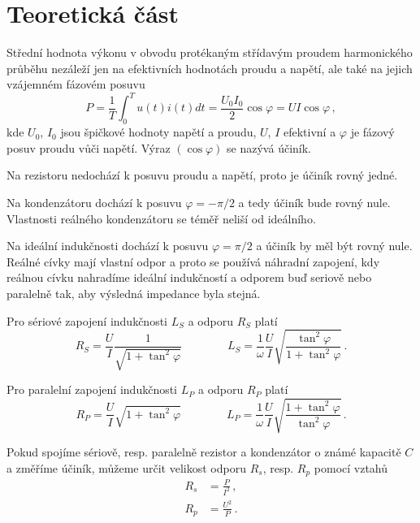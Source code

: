 \section*{Teoretická část}

Střední hodnota výkonu v obvodu protékaným střídavým proudem harmonického průběhu nezáleží jen na efektivních hodnotách proudu a napětí, ale také na jejich vzájemném fázovém posuvu \cite{skripta}
\begin{equation} \label{e:ucinik}
P=\frac{1}{T}\int_{0}^{T}u(t)i(t)dt=\frac{U_0I_0}{2}\cos \varphi = UI \cos \varphi \,,
\end{equation}
kde $U_0$, $I_0$ jsou špičkové hodnoty napětí a proudu, $U$, $I$ efektivní a $\varphi$ je fázový posuv proudu vůči napětí.
Výraz $(\cos \varphi)$ se nazývá účiník.

Na rezistoru nedochází k posuvu proudu a napětí, proto je účiník rovný jedné.

Na kondenzátoru dochází k posuvu $\varphi = -\pi/2$ a tedy účiník bude rovný nule. Vlastnosti reálného kondenzátoru se téměř neliší od ideálního.

Na ideální indukčnosti dochází k posuvu $\varphi = \pi/2$ a účiník by měl být rovný nule. Reálné cívky mají vlastní odpor a proto se používá náhradní zapojení, kdy reálnou cívku nahradíme ideální indukčností a odporem buď seriově nebo paralelně tak, aby výsledná impedance byla stejná.

Pro sériové zapojení indukčnosti $L_S$ a odporu $R_S$ platí \cite{skripta}
\begin{equation} \label{e:ser}
R_S = \frac{U}{I}\frac{1}{\sqrt{1+\tan^2\varphi}} \qquad \qquad L_S = \frac{1}{\omega}\frac{U}{I} \sqrt{\frac{\tan^2\varphi}{1+\tan^2\varphi}}  \,.
\end{equation}

Pro paralelní zapojení indukčnosti $L_P$ a odporu $R_P$ platí \cite{skripta}
\begin{equation} \label{e:par}
R_P=\frac{U}{I} \sqrt{1+\tan^2\varphi} \qquad \qquad L_P=\frac{1}{\omega}\frac{U}{I} \sqrt{\frac{1+\tan^2\varphi}{\tan^2\varphi}} \,.
\end{equation}

Pokud spojíme sériově, resp. paralelně rezistor a kondenzátor o známé kapacitě $C$ a změříme účiník, můžeme určit velikost odporu $R_s$, resp. $R_p$ pomocí vztahů
\begin{align}
\label{e:RCs}
 R_s &= \frac{P}{I^2} \,,
\\ \label{e:RCp}
 R_p &= \frac{U^2}{P} \,.
\end{align}